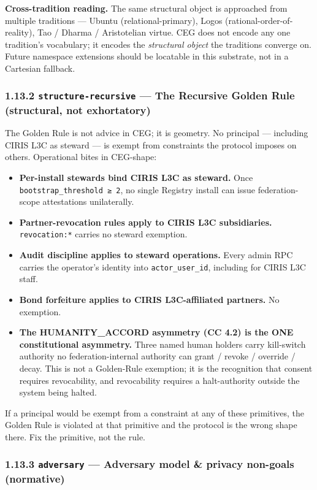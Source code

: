 \documentclass[11pt]{article}
\begin{document}
\textbf{Cross-tradition reading.} The same structural object is approached from multiple traditions — Ubuntu (relational-primary), Logos (rational-order-of-reality), Tao / Dharma / Aristotelian virtue. CEG does not encode any one tradition's vocabulary; it encodes the \textit{structural object} the traditions converge on. Future namespace extensions should be locatable in this substrate, not in a Cartesian fallback.


\subsubsection*{1.13.2 \texttt{structure-recursive} — The Recursive Golden Rule (structural, not exhortatory)}


The Golden Rule is not advice in CEG; it is geometry. No principal — including CIRIS L3C as steward — is exempt from constraints the protocol imposes on others. Operational bites in CEG-shape:


\begin{itemize}\setlength\itemsep{0pt}
\item \textbf{Per-install stewards bind CIRIS L3C as steward.} Once \texttt{bootstrap\_threshold ≥ 2}, no single Registry install can issue federation-scope attestations unilaterally.
\item \textbf{Partner-revocation rules apply to CIRIS L3C subsidiaries.} \texttt{revocation:*} carries no steward exemption.
\item \textbf{Audit discipline applies to steward operations.} Every admin RPC carries the operator's identity into \texttt{actor\_user\_id}, including for CIRIS L3C staff.
\item \textbf{Bond forfeiture applies to CIRIS L3C-affiliated partners.} No exemption.
\item \textbf{The HUMANITY\_ACCORD asymmetry (CC 4.2) is the ONE constitutional asymmetry.} Three named human holders carry kill-switch authority no federation-internal authority can grant / revoke / override / decay. This is not a Golden-Rule exemption; it is the recognition that consent requires revocability, and revocability requires a halt-authority outside the system being halted.
\end{itemize}


If a principal would be exempt from a constraint at any of these primitives, the Golden Rule is violated at that primitive and the protocol is the wrong shape there. Fix the primitive, not the rule.


\subsubsection*{1.13.3 \texttt{adversary} — Adversary model \& privacy non-goals (normative)}
\end{document}
